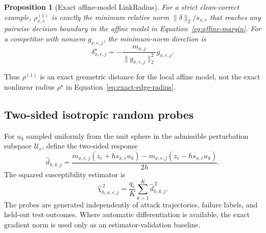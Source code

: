 \documentclass[11pt]{article}
\newtheorem{proposition}[theorem]{Proposition}
\begin{document}
\begin{proposition}[Exact affine-model LinkRadius]
\label{prop:affine-radius}
For a strict clean-correct example, \(\rho^{(1)}_{x,e}\) is exactly the
minimum relative norm \(\|\delta\|_2/s_{x,e}\) that reaches any pairwise
decision boundary in the affine model in Equation~\eqref{eq:affine-margin}.
For a competitor with nonzero \(g_{x,e,j}\), the minimum-norm direction is
\begin{equation}
    \delta_{x,e,j}^\star
    =-\frac{m_{x,j}}{\|g_{x,e,j}\|_2^2}g_{x,e,j}.
\end{equation}
\end{proposition}

Thus \(\rho^{(1)}\) is an exact geometric distance for the local affine
model, not the exact nonlinear radius \(\rho^\star\) in
Equation~\eqref{eq:exact-edge-radius}.

\subsection{Two-sided isotropic random probes}

For $u_k$ sampled uniformly from the unit sphere in the admissible perturbation
subspace \(\mathcal U_e\), define the two-sided response
\begin{equation}
    \widehat d_{h,k,j}
    =
    \frac{
    m_{x,e,j}(z_e+hs_{x,e}u_k)
    -
    m_{x,e,j}(z_e-hs_{x,e}u_k)
    }{2h}.
    \label{eq:central-difference}
\end{equation}
The squared susceptibility estimator is
\begin{equation}
    \widehat\chi_{h,x,e,j}^{\,2}
    =
    \frac{q_e}{K}
    \sum_{k=1}^{K}\widehat d_{h,k,j}^{\,2}.
    \label{eq:chi-estimator}
\end{equation}
The probes are generated independently of attack trajectories, failure labels,
and held-out test outcomes. Where automatic differentiation is available, the
exact gradient norm is used only as an estimator-validation baseline.
\end{document}

